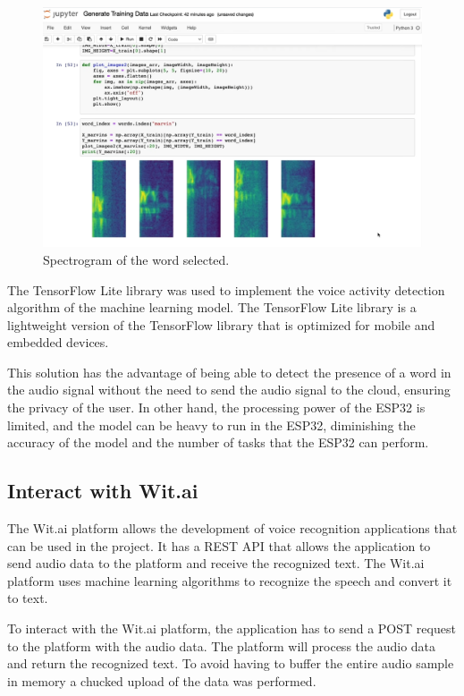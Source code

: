 \begin{figure}[H]
    \centering
    \includegraphics[width=1\textwidth]{Images/spec_marvin.png}
    \caption{Spectrogram of the word selected.}
    \label{fig:Spectre}
\end{figure}

The TensorFlow Lite library was used to implement the voice activity detection algorithm of the machine learning model. The TensorFlow Lite library is a lightweight version of the TensorFlow library that is optimized for mobile and embedded devices. 

This solution has the advantage of being able to detect the presence of a word in the audio signal without the need to send the audio signal to the cloud, ensuring the privacy of the user. In other hand, the processing power of the ESP32 is limited, and the model can be heavy to run in the ESP32, diminishing the accuracy of the model and the number of tasks that the ESP32 can perform.

\subsection{Interact with Wit.ai}

The Wit.ai platform allows the development of voice recognition applications that can be used in the project. It has a REST API that allows the application to send audio data to the platform and receive the recognized text. The Wit.ai platform uses machine learning algorithms to recognize the speech and convert it to text. 

To interact with the Wit.ai platform, the application has to send a POST request to the platform with the audio data. The platform will process the audio data and return the recognized text. To avoid having to buffer the entire audio sample in memory a chucked upload of the data was performed.

